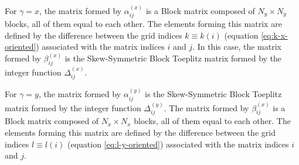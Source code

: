 \documentclass[manuscript,revised]{geophysics}
\begin{document}
For $\gamma = x$, the matrix formed by $\alpha_{ij}^{(x)}$ is a Block 
matrix composed of $N_{y} \times N_{y}$ blocks, all of them equal to each other.
The elements forming this matrix are defined by the difference between the 
grid indices $k \equiv k(i)$ (equation \ref{eq:k-x-oriented}) associated with
the matrix indices $i$ and $j$. In this case, the matrix formed by 
$\beta_{ij}^{(x)}$ is the Skew-Symmetric Block Toeplitz matrix
formed by the integer function $\Delta_{ij}^{(x)}$. 

For $\gamma = y$, the matrix formed by $\alpha_{ij}^{(y)}$ is the 
Skew-Symmetric Block Toeplitz matrix
formed by the integer function $\Delta_{ij}^{(y)}$. 
The matrix formed by $\beta_{ij}^{(x)}$ is a Block 
matrix composed of $N_{x} \times N_{x}$ blocks, all of them equal to each other.
The elements forming this matrix are defined by the difference between the 
grid indices $l \equiv l(i)$ (equation \ref{eq:l-y-oriented}) associated with
the matrix indices $i$ and $j$. 
\end{document}
